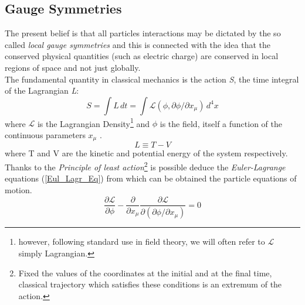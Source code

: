 \subsection{Gauge Symmetries}
\label{cap1:gaugeSymm}
The present belief is that all particles interactions may be dictated by the so called \textit{local gauge symmetries} and this is connected with the idea that  the conserved physical quantities (such as electric charge) are conserved in local regions of space and not just globally\cite{HalzenMartin}. \\
The fundamental quantity in classical mechanics is the action \textit{S}, the time integral of the Lagrangian \textit{L}:
\begin{equation}
S = \int L\, dt = \int \mathcal{L}(\phi, \partial \phi / \partial x_{\mu}) \,d^{4}x
\end{equation}
where $\mathcal{L}$ is the Lagrangian Density\footnote{however, following standard use in field theory, we will often refer to $\mathcal{L}$ simply Lagrangian.} 
and $\phi$ is the field, itself a function of the continuous parameters $x_{\mu}$ \cite{Peskin}\cite{Maggiore}.
\begin{equation}
L \equiv T - V
\end{equation}
where T and V are the kinetic and potential energy of the system respectively.\\
Thanks to the \textit{Principle of least action}\footnote{Fixed the values of the coordinates at the initial and at the final time, classical trajectory which satisfies these conditions is an extremum of the action.} is possible deduce the \textit{Euler-Lagrange} equations (\ref{Eul_Lagr_Eq}) from which can be obtained the particle equations of motion.
\begin{equation}
\frac{\partial \mathcal{L}}{\partial \phi} - \frac{\partial}{\partial x_{\mu}}\frac{\partial \mathcal{L}}{\partial(\partial \phi / \partial x_{\mu})} = 0
\label{Eul_Lagr_Eq}
\end{equation}


